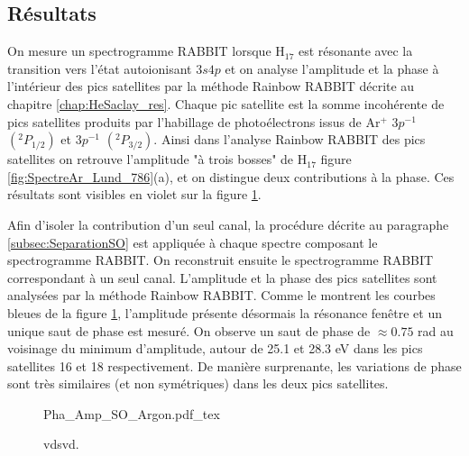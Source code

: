 \subsection{Résultats}
On mesure un spectrogramme RABBIT lorsque H$_{17}$ est résonante avec la transition vers l'état autoionisant $3s4p$ et on analyse l'amplitude et la phase à l'intérieur des pics satellites par la méthode Rainbow RABBIT décrite au chapitre \ref{chap:HeSaclay_res}. Chaque pic satellite est la somme incohérente de pics satellites produits par l'habillage de photoélectrons issus de Ar$^+$ $3p^{-1}$ $(^{2}P_{1/2})$ et $3p^{-1}$ $(^{2}P_{3/2})$. Ainsi dans l'analyse Rainbow RABBIT des pics satellites on retrouve l'amplitude "à trois bosses" de H$_{17}$ figure \ref{fig:SpectreAr_Lund_786}(a), et on distingue deux contributions à la phase. Ces résultats sont visibles en violet sur la figure \ref{fig:Pha_Amp_SO_Argon}.

Afin d'isoler la contribution d'un seul canal, la procédure décrite au paragraphe \ref{subsec:SeparationSO} est appliquée à chaque spectre composant le spectrogramme RABBIT. On reconstruit ensuite le spectrogramme RABBIT correspondant à un seul canal. L'amplitude et la phase des pics satellites sont analysées par la méthode Rainbow RABBIT. Comme le montrent les courbes bleues de la figure \ref{fig:Pha_Amp_SO_Argon}, l'amplitude présente désormais la résonance fenêtre et un unique saut de phase est mesuré. On observe un saut de phase de $\approx 0.75$ rad au voisinage du minimum d'amplitude, autour de 25.1 et 28.3 eV dans les pics satellites 16 et 18 respectivement. De manière surprenante, les variations de phase sont très similaires (et non symétriques) dans les deux pics satellites.

\begin{figure}
\centering
\def\svgwidth{1\textwidth}
{Pha_Amp_SO_Argon.pdf_tex}
\caption{vdsvd.}
\label{fig:Pha_Amp_SO_Argon}
\end{figure}


